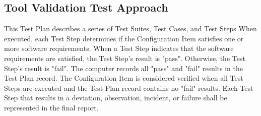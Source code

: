 \subsection{Tool Validation Test Approach}
This Test Plan describes a series of Test Suites, Test Cases, and Test Steps
When executed, each Test Step determines if the Configuration Item satisfies one
or more software requirements.  When a Test Step indicates that the software
requirements are satisfied, the Test Step's result is "pass".  Otherwise, the
Test Step's result is "fail".  The computer records all "pass" and "fail"
results in the Test Plan record.  The Configuration Item is considered
verified when all Test Steps are executed and the Test Plan record contains
no "fail" results.  Each Test Step that results in a deviation, observation,
incident, or failure shall be represented in the final report.
